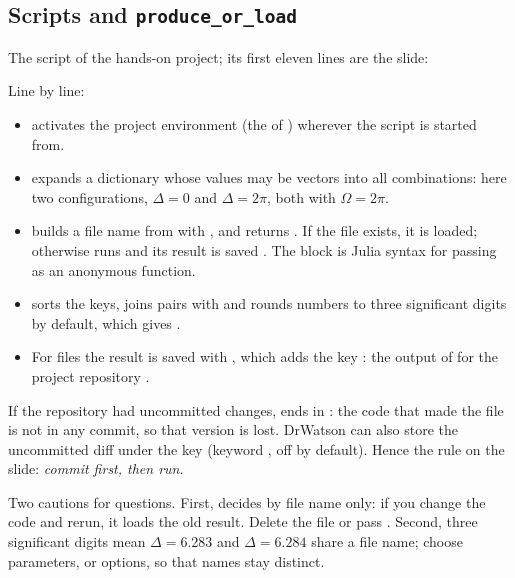 \subsection{Scripts and \texttt{produce\_or\_load}}

The script of the hands-on project; its first eleven lines are the slide:


Line by line:
\begin{itemize}
  \item {} activates the project environment (the
         of ) wherever the script is started from.
  \item {} expands a dictionary whose values may be vectors into all
        combinations: here two configurations, $\Delta = 0$ and $\Delta = 2\pi$, both with
        $\Omega = 2\pi$.
  \item {} builds a file name from  with
        , and returns . If the file exists, it is loaded;
        otherwise  runs and its result is saved . The
         block is Julia syntax for passing  as an anonymous function.
  \item {} sorts the keys, joins  pairs with \cmd{\_} and rounds
        numbers to three significant digits by default, which gives
        .
  \item For  files the result is saved with , which adds the key
        : the output of  for the project repository
        .
\end{itemize}
If the repository had uncommitted changes,  ends in : the
code that made the file is not in any commit, so that version is lost. DrWatson can also
store the uncommitted diff under the key  (keyword , off by
default). Hence the rule on the slide: \emph{commit first, then run}.

Two cautions for questions. First,  decides by file name only: if
you change the code and rerun, it loads the old result. Delete the file or pass
. Second, three significant digits mean $\Delta = 6.283$ and
$\Delta = 6.284$ share a file name; choose parameters, or  options, so that
names stay distinct.

